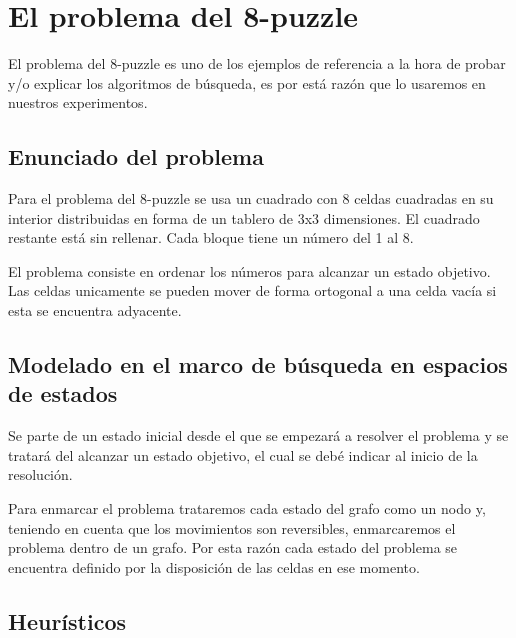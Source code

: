 \documentclass[runningheads]{llncs}
\begin{document}
\section{El problema del 8-puzzle}\label{seccion_problema}

El problema del 8-puzzle es uno de los ejemplos de referencia a la hora de probar y/o explicar los algoritmos de búsqueda, es por está razón que lo usaremos en nuestros experimentos.

\subsection{Enunciado del problema}

Para el problema del 8-puzzle se usa un cuadrado con 8 celdas cuadradas en su interior distribuidas en forma de un tablero de 3x3 dimensiones. El cuadrado restante está sin rellenar. Cada bloque tiene un número del 1 al 8.

El problema consiste en ordenar los números para alcanzar un estado objetivo. Las celdas unicamente se pueden mover de forma ortogonal a una celda vacía si esta se encuentra adyacente.

\subsection{Modelado en el marco de búsqueda en espacios de estados}

Se parte de un estado inicial desde el que se empezará a resolver el problema y se tratará del alcanzar un estado objetivo, el cual se debé indicar al inicio de la resolución. 

Para enmarcar el problema trataremos cada estado del grafo como un nodo y, teniendo en cuenta que los movimientos son reversibles, enmarcaremos el problema dentro de un grafo. Por esta razón cada estado del problema se encuentra definido por la disposición de las celdas en ese momento.

\subsection{Heurísticos}
\end{document}
